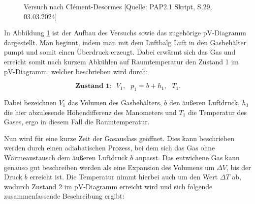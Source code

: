\documentclass{article}
\begin{document}
\begin{figure}[h]
  \centering
  \hfill
  \hfill
  \caption{Versuch nach Clément-Desormes [Quelle: PAP2.1 Skript, S.29, 03.03.2024]}
  \label{fig:CD}
\end{figure}

In Abbildung \ref{fig:CD} ist der Aufbau des Versuchs sowie das zugehörige pV-Diagramm dargestellt. Man beginnt, indem man mit dem Luftbalg Luft in den Gasbehälter pumpt und somit einen Überdruck erzeugt. Dabei erwärmt sich das Gas und erreicht somit nach kurzem Abkühlen auf Raumtemperatur den Zustand 1 im pV-Diagramm, welcher beschrieben wird durch:

\begin{equation}
    \textbf{Zustand 1:} \ \ \ V_1, \ \ \ p_1 = b + h_1, \ \ \ T_1.
\end{equation}

Dabei bezeichnen $V_1$ das Volumen des Gasbehälters, $b$ den äußeren Luftdruck, $h_1$ die hier abzulesende Höhendifferenz des Manometers und $T_1$ die Temperatur des Gases, ergo in diesem Fall die Raumtemperatur.

Nun wird für eine kurze Zeit der Gasauslass geöffnet. Dies kann beschrieben werden durch einen adiabatischen Prozess, bei dem sich das Gas ohne Wärmeaustausch dem äußeren Luftdruck $b$ anpasst. Das entwichene Gas kann genauso gut beschreiben werden als eine Expansion des Volumens um $\Delta V$, bis der Druck $b$ erreicht ist. Die Temperatur nimmt hierbei auch um den Wert $\Delta T$ ab, wodurch Zustand 2 im pV-Diagramm erreicht wird und sich folgende zusammenfassende Beschreibung ergibt:
\end{document}
